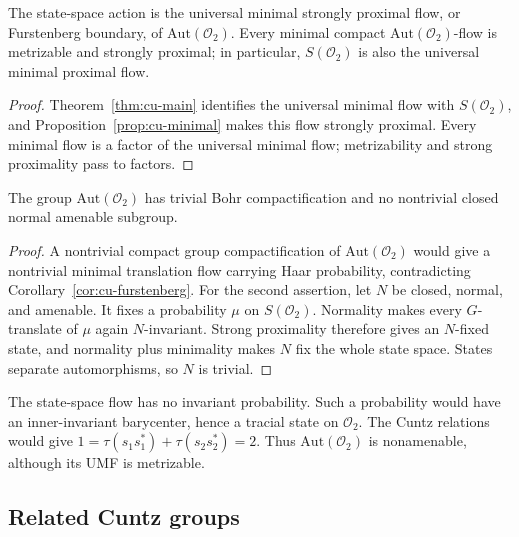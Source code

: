 \begin{corollary}\label{cor:cu-furstenberg}
 The state-space action is the universal minimal
strongly proximal flow, or Furstenberg boundary, of $\mathrm{Aut}(\mathcal{O}_2)$. Every minimal compact $\mathrm{Aut}(\mathcal{O}_2)$-flow is metrizable
and strongly proximal; in particular, $S(\mathcal{O}_2)$ is also the
universal minimal proximal flow.
\end{corollary}

\begin{proof}
Theorem~\ref{thm:cu-main} identifies the universal minimal flow with $S(\mathcal{O}_2)$, and Proposition~\ref{prop:cu-minimal} makes this flow strongly
proximal. Every minimal flow is a factor of the universal minimal flow;
metrizability and strong proximality pass to factors.
\end{proof}

\begin{corollary}\label{cor:cu-radicals}
 The group $\mathrm{Aut}(\mathcal{O}_2)$ has trivial
Bohr compactification and no nontrivial closed normal amenable subgroup.
\end{corollary}

\begin{proof}
A nontrivial compact group compactification of $\mathrm{Aut}(\mathcal{O}_2)$
would give a nontrivial minimal translation flow carrying Haar probability,
contradicting Corollary~\ref{cor:cu-furstenberg}. For the second assertion, let 
$N$ be closed, normal, and amenable. It fixes a probability $\mu$ on $S(\mathcal{O}_2)$. Normality makes every $G$-translate of $\mu$ again $N$-invariant. Strong proximality therefore gives an $N$-fixed state, and
normality plus minimality makes $N$ fix the whole state space. States
separate automorphisms, so $N$ is trivial.
\end{proof}

\begin{remark}\label{rem:cu-aut-nonamenable}
 The state-space flow has no invariant
probability. Such a probability would have an inner-invariant barycenter,
hence a tracial state on $\mathcal{O}_2$. The Cuntz relations would give $1=\tau(s_1s_1^*)+\tau(s_2s_2^*)=2$. Thus $\mathrm{Aut}(\mathcal{O}_2)$ is
nonamenable, although its UMF is metrizable.
\end{remark}


\subsection{Related Cuntz groups}

